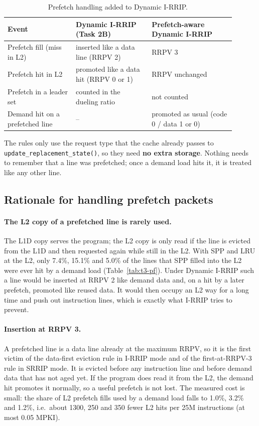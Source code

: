 \documentclass[11pt]{article}
\begin{document}
\begin{table}[H]
\centering
\small
\begin{tabular}{p{0.27\linewidth}p{0.3\linewidth}p{0.33\linewidth}}
\toprule
Event & Dynamic I-RRIP (Task 2B) & Prefetch-aware Dynamic I-RRIP\\
\midrule
Prefetch fill (miss in L2) & inserted like a data line (RRPV 2) & RRPV 3\\
Prefetch hit in L2 & promoted like a data hit (RRPV 0 or 1) & RRPV unchanged\\
Prefetch in a leader set & counted in the dueling ratio & not counted\\
Demand hit on a prefetched line & -- & promoted as usual (code 0 / data 1 or 0)\\
\bottomrule
\end{tabular}
\caption{Prefetch handling added to Dynamic I-RRIP.}
\label{tab:t3-rules}
\end{table}

The rules only use the request type that the cache already passes to
\texttt{update\_replacement\_state()}, so they need \textbf{no extra storage}. Nothing
needs to remember that a line was prefetched; once a demand load hits it, it is
treated like any other line.

\subsection{Rationale for handling prefetch packets}

\paragraph{The L2 copy of a prefetched line is rarely used.}
The L1D copy serves the program; the L2 copy is only read if the line is
evicted from the L1D and then requested again while still in the L2. With SPP
and LRU at the L2, only 7.4\%, 15.1\% and 5.0\% of the lines that SPP filled
into the L2 were ever hit by a demand load (Table~\ref{tab:t3-pf}). Under
Dynamic I-RRIP such a line would be inserted at RRPV 2 like demand data and,
on a hit by a later prefetch, promoted like reused data. It would then occupy
an L2 way for a long time and push out instruction lines, which is exactly
what I-RRIP tries to prevent.

\paragraph{Insertion at RRPV 3.}
A prefetched line is a data line already at the maximum RRPV, so it is the
first victim of the data-first eviction rule in I-RRIP mode and of the
first-at-RRPV-3 rule in SRRIP mode. It is evicted before any instruction line
and before demand data that has not aged yet. If the program does read it from
the L2, the demand hit promotes it normally, so a useful prefetch is not lost.
The measured cost is small: the share of L2 prefetch fills used by a demand
load falls to 1.0\%, 3.2\% and 1.2\%, i.e.\ about 1300, 250 and 350 fewer L2
hits per 25M instructions (at most 0.05 MPKI).
\end{document}
